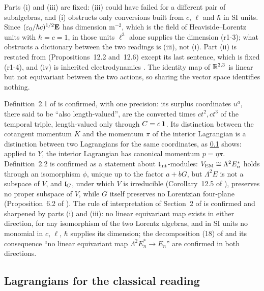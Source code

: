 Parts (i) and (iii) are fixed: (iii) could have failed for a different pair of subalgebras, and (i) obstructs only conversions built
from $c$, $\ell$ and $\hbar$ in SI units. Since $(\varepsilon_0/\hbar c)^{1/2}\mathbf E$ has dimension $\mathrm m^{-2}$, which is the field of
Heaviside--Lorentz units with $\hbar=c=1$, in those units $\ell^3$ alone supplies the dimension (r1-3); what obstructs a dictionary between
the two readings is (iii), not (i). Part (ii) is restated from \cite{ES17} (Propositions~12.2 and~12.6) except its last sentence, which is
fixed (r1-4), and (iv) is inherited electrodynamics \cite{HenneauxTeitelboim92}. The identity map of $\mathbb{R}^{3,3}$ is linear but not equivariant between the two
actions, so sharing the vector space identifies nothing.

\begin{remark}
\label{r1:rem:fmb1}
Definition~2.1 of \cite{FMB} is confirmed, with one precision: its surplus coordinates $u^a$, there said to be ``also length-valued'', are
the converted times $ct^2,ct^3$ of the temporal triple, length-valued only through $C=c\,\mathbf 1$. Its distinction between the cotangent
momentum $K$ and the momentum $\pi$ of the interior Lagrangian is a distinction between two Lagrangians for the same coordinates, as
\cref{r1:sec:cl} shows: applied to $Y$, the interior Lagrangian has canonical momentum $p=\eta\pi$. Definition~2.2 is confirmed as a
statement about $\mathfrak l_{\rm int}$-modules: $V_{\rm EM}\cong\Lambda^2E_n^*$ holds through an isomorphism $\phi$, unique up to the factor $a+bG$, but
$\Lambda^2E$ is not a subspace of $V$, and $\mathfrak l_G$, under which $V$ is irreducible (Corollary~12.5 of \cite{ES17}), preserves no proper
subspace of $V$, while $G$ itself preserves no Lorentzian four-plane (Proposition~6.2 of \cite{FMB}). The rule of
interpretation of Section~2 of \cite{FMB} is confirmed and sharpened by parts (i) and (iii): no linear equivariant map exists in either
direction, for any isomorphism of the two Lorentz algebras, and in SI units no monomial in $c$, $\ell$, $\hbar$ supplies its dimension; the decomposition (18) of
\cite{FMB} and its consequence ``no linear equivariant map $\Lambda^2E_n^*\to E_n$'' are confirmed in both directions.
\end{remark}

\subsection{Lagrangians for the classical reading}
\label{r1:sec:cl}

